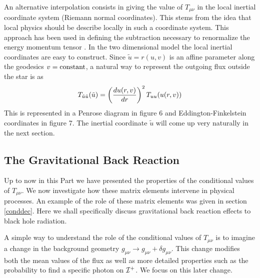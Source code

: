 An alternative interpolation
 consists in giving the value of $T_{\mu\nu}$ in the local
inertial coordinate system (Riemann normal coordinates). This stems from the
idea that
local
physics
should be describe locally in such a coordinate system. This approach has
 been used
in defining the subtraction necessary to
renormalize the energy momentum tensor
\cite{birreld}\cite{mpblocal}\cite{mas}. In the two dimensional model the
local inertial coordinates are easy to construct. Since $\tilde u = r(u,v)$
is an affine parameter along the geodesics
$v={\rm constant}$, a natural way to represent the outgoing flux outside the
star is as
\begin{equation}
T_{\tilde u \tilde u} (\tilde u) = \left( {d u(r,v) \over dr} \right )^2
T_{uu}(u(r,v))\label{localc}
\end{equation}
This is represented in  a
Penrose diagram in figure 6 and Eddington-Finkelstein coordinates in figure 7.
The inertial coordinate $\tilde u$ will come up
very naturally in the next section.

\subsection{The Gravitational Back Reaction}\label{back}


Up to now in this Part we have presented the properties of the
conditional values of $ T_{\mu\nu}$. We now investigate how these matrix
elements intervene in physical processes. An example of the role of these
matrix elements was given in section \ref{conddec}.
Here we shall specifically discuss
gravitational back reaction effects to black hole radiation.

A simple way to understand the role of the
conditional values of $ T_{\mu\nu}$ is to imagine a change in the background
geometry $g_{\mu\nu} \to g_{\mu\nu} + \delta g_{\mu\nu}$. This change
modifies both the mean values of the flux as well as more detailed properties
such as the probability to find a specific photon on ${\cal{I}}^+$.
We focus on this later change.

